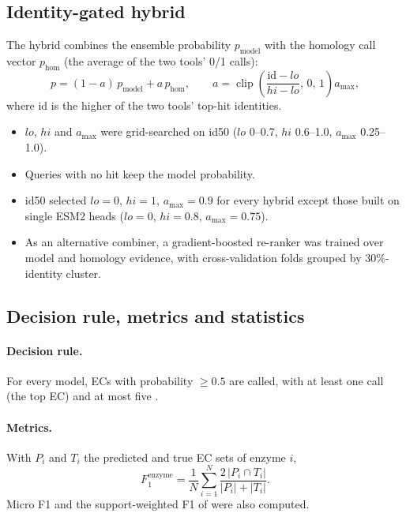 \documentclass[11pt]{article}
\begin{document}
\subsection{Identity-gated hybrid}
The hybrid combines the ensemble probability $p_\text{model}$ with the homology call vector $p_\text{hom}$ (the
average of the two tools' 0/1 calls):
\begin{equation}
p = (1 - a)\, p_\text{model} + a\, p_\text{hom}, \qquad a = \operatorname{clip}\!\left(\frac{\mathrm{id} - lo}{hi - lo},\,
0,\, 1\right) a_{\max},
\end{equation}
where id is the higher of the two tools' top-hit identities.
\begin{itemize}
  \item $lo$, $hi$ and $a_{\max}$ were grid-searched on id50 ($lo$ 0--0.7, $hi$ 0.6--1.0, $a_{\max}$ 0.25--1.0).
  \item Queries with no hit keep the model probability.
  \item id50 selected $lo = 0$, $hi = 1$, $a_{\max} = 0.9$ for every hybrid except those built on single ESM2 heads
        ($lo = 0$, $hi = 0.8$, $a_{\max} = 0.75$).
  \item As an alternative combiner, a gradient-boosted re-ranker \cite{sklearn} was trained over model and homology
        evidence, with cross-validation folds grouped by 30\%-identity cluster.
\end{itemize}

\subsection{Decision rule, metrics and statistics}
\paragraph{Decision rule.} For every model, ECs with probability $\geq 0.5$ are called, with at least one call (the top
EC) and at most five \cite{milbc}.

\paragraph{Metrics.} With $P_i$ and $T_i$ the predicted and true EC sets of enzyme $i$,
\begin{equation}
F_1^{\text{enzyme}} = \frac{1}{N}\sum_{i=1}^{N} \frac{2\,|P_i \cap T_i|}{|P_i| + |T_i|}.
\end{equation}
Micro F1 and the support-weighted F1 of \cite{clean,milbc} were also computed.
\end{document}
